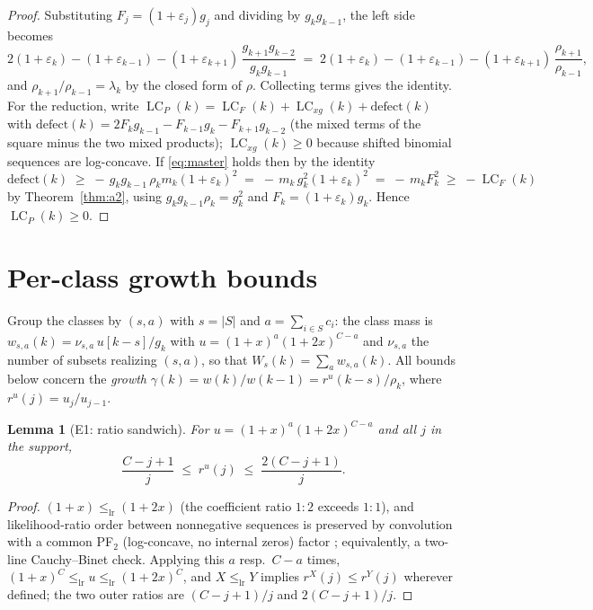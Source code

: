 \documentclass[11pt]{article}
\newtheorem{lemma}[theorem]{Lemma}
\theoremstyle{definition}
\newcommand{\eps}{\varepsilon}
\DeclareMathOperator{\lc}{LC}
\begin{document}
\begin{proof}
Substituting $F_j=(1+\eps_j)g_j$ and dividing by $g_kg_{k-1}$, the
left side becomes
\[
  2(1+\eps_k)-(1+\eps_{k-1})-(1+\eps_{k+1})\,
  \frac{g_{k+1}g_{k-2}}{g_kg_{k-1}}
  \;=\;2(1+\eps_k)-(1+\eps_{k-1})-(1+\eps_{k+1})\,\frac{\rho_{k+1}}{\rho_{k-1}},
\]
and $\rho_{k+1}/\rho_{k-1}=\lambda_k$ by the closed form of $\rho$.
Collecting terms gives the identity.  For the reduction, write
$\lc_P(k)=\lc_F(k)+\lc_{xg}(k)+\mathrm{defect}(k)$ with
$\mathrm{defect}(k)=2F_kg_{k-1}-F_{k-1}g_k-F_{k+1}g_{k-2}$ (the mixed
terms of the square minus the two mixed products); $\lc_{xg}(k)\ge0$
because shifted binomial sequences are log-concave.  If
\eqref{eq:master} holds then by the identity
\[
  \mathrm{defect}(k)\;\ge\;-\,g_kg_{k-1}\,\rho_km_k(1+\eps_k)^2
  \;=\;-\,m_k\,g_k^2(1+\eps_k)^2\;=\;-\,m_kF_k^2\;\ge\;-\lc_F(k)
\]
by Theorem~\ref{thm:a2}, using $g_kg_{k-1}\rho_k=g_k^2$ and
$F_k=(1+\eps_k)g_k$.  Hence $\lc_P(k)\ge0$.
\end{proof}

\section{Per-class growth bounds}\label{sec:classes}

Group the classes by $(s,a)$ with $s=|S|$ and $a=\sum_{i\in S}c_i$:
the class mass is $w_{s,a}(k)=\nu_{s,a}\,u[k-s]/g_k$ with
$u=(1+x)^a(1+2x)^{C-a}$ and $\nu_{s,a}$ the number of subsets
realizing $(s,a)$, so that $W_s(k)=\sum_aw_{s,a}(k)$.  All bounds below concern the
\emph{growth} $\gamma(k)=w(k)/w(k-1)=r^u(k-s)/\rho_k$, where
$r^u(j)=u_j/u_{j-1}$.

\begin{lemma}[E1: ratio sandwich]\label{lem:e1}
For $u=(1+x)^a(1+2x)^{C-a}$ and all $j$ in the support,
\[
  \frac{C-j+1}{j}\;\le\;r^u(j)\;\le\;\frac{2(C-j+1)}{j}.
\]
\end{lemma}

\begin{proof}
$(1+x)\le_{\mathrm{lr}}(1+2x)$ (the coefficient ratio $1:2$ exceeds
$1:1$), and likelihood-ratio order between nonnegative sequences is
preserved by convolution with a common PF$_2$ (log-concave, no
internal zeros) factor \cite[Thm.~1.C.9]{ShakedShanthikumar};
equivalently, a two-line Cauchy--Binet check.  Applying this $a$
resp.\ $C-a$ times,
$(1+x)^C\le_{\mathrm{lr}}u\le_{\mathrm{lr}}(1+2x)^C$, and
$X\le_{\mathrm{lr}}Y$ implies $r^X(j)\le r^Y(j)$ wherever defined; the
two outer ratios are $(C-j+1)/j$ and $2(C-j+1)/j$.
\end{proof}
\end{document}
